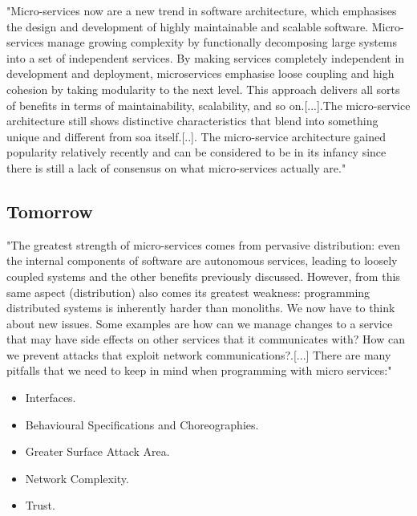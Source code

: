 "Micro-services now are a new trend in software architecture, which emphasises the design and development of highly maintainable and scalable software. Micro-services manage growing complexity by functionally decomposing large systems into a set of independent services. By making services completely independent in development and deployment, microservices emphasise loose coupling and high cohesion by taking modularity to the next level. This approach delivers all sorts of benefits in terms of maintainability, scalability, and so on.[...].The micro-service architecture still shows distinctive characteristics that blend into something unique and different from \gls{soa} itself.[..]. The micro-service architecture gained popularity relatively recently and can be considered to be in its infancy since there is still a lack of consensus on what micro-services actually are."~\cite{microservicesStateOfArt}

\subsection{Tomorrow}

"The greatest strength of micro-services comes from pervasive distribution: even the internal components of software are autonomous services, leading to loosely coupled systems and the other benefits previously discussed. However, from this same aspect (distribution) also comes its greatest weakness: programming distributed systems is inherently harder than monoliths. We now have to think about new issues. Some examples are how can we manage changes to a service that may have side effects on other services that it communicates with? How can we prevent attacks that exploit network communications?.[...] There are many pitfalls that we need to keep in mind when programming with
micro services:"~\cite{microservicesStateOfArt}

\begin{itemize}
    \item Interfaces.
    \item Behavioural Specifications and Choreographies.
    \item Greater Surface Attack Area.
    \item Network Complexity.
    \item Trust.
\end{itemize}
